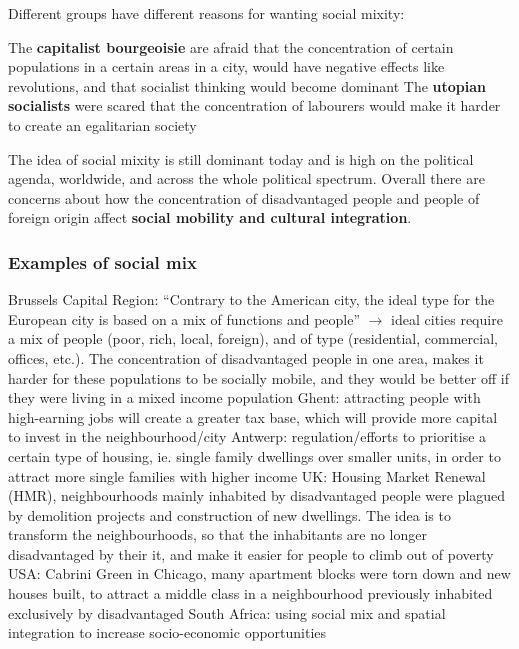 \documentclass{article}
\begin{document}
Different groups have different reasons for wanting social mixity: 

\begin{outline}
	\1 The \textbf{capitalist bourgeoisie} are afraid that the concentration of certain populations in a certain areas in a city, would have negative effects like revolutions, and that socialist thinking would become dominant
	\1 The \textbf{utopian socialists} were scared that the concentration of labourers would make it harder to create an egalitarian society
\end{outline}

The idea of social mixity is still dominant today and is high on the political agenda, worldwide, and across the whole political spectrum. Overall there are concerns about how the concentration of disadvantaged people and people of foreign origin affect \textbf{social mobility and cultural integration}.

\subsubsection{Examples of social mix}

\begin{outline}
	\1  Brussels Capital Region: ``Contrary to the American city, the ideal type for the European city is based on a mix of functions and people'' $\rightarrow$ ideal cities require a mix of people (poor, rich, local, foreign), and of type (residential, commercial, offices, etc.). The concentration of disadvantaged people in one area, makes it harder for these populations to be socially mobile, and they would be better off if they were living in a mixed income population
	\1 Ghent: attracting people with high-earning jobs will create a greater tax base, which will provide more capital to invest in the neighbourhood/city
	\1 Antwerp: regulation/efforts to prioritise a certain type of housing, ie. single family dwellings over smaller units, in order to attract more single families with higher income
	\1 UK: Housing Market Renewal (HMR), neighbourhoods mainly inhabited by disadvantaged people were plagued by demolition projects and construction of new dwellings. The idea is to transform the neighbourhoods, so that the inhabitants are no longer disadvantaged by their it, and make it easier for people to climb out of poverty
	\1 USA: Cabrini Green in Chicago, many apartment blocks were torn down and new houses built, to attract a middle class in a neighbourhood previously inhabited exclusively by disadvantaged
	\1 South Africa: using social mix and spatial integration to increase socio-economic opportunities
\end{outline}
\end{document}
